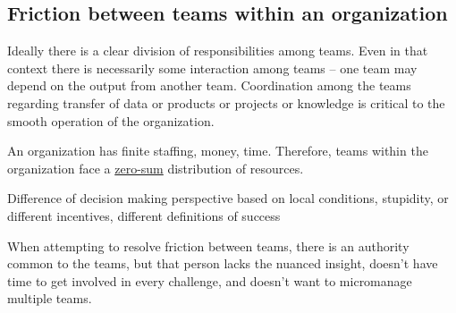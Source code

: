 \subsection{Friction between teams within an organization}

Ideally there is a clear division of responsibilities among teams. Even in that context there is necessarily some interaction among teams -- one team may depend on the output from another team. Coordination among the teams regarding transfer of data or products or projects or knowledge is critical to the smooth operation of the organization. 

An organization has finite staffing, money, time. Therefore, teams within the organization face a \href{https://en.wikipedia.org/wiki/Zero-sum_game}{zero-sum} distribution of resources.

Difference of decision making perspective based on local conditions, stupidity, or different incentives, different definitions of success

When attempting to resolve friction between teams, there is an authority common to the teams, but that person lacks the nuanced insight, doesn't have time to get involved in every challenge, and doesn't want to micromanage multiple teams.